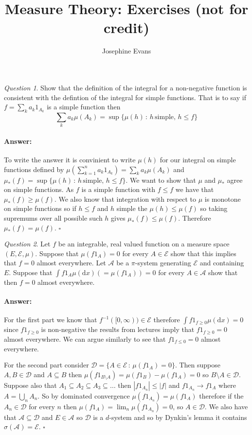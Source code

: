 \documentclass[11pt]{article}
\author{
Josephine Evans
}
\title{Measure Theory: Exercises (not for credit)}
\theoremstyle{definition}
\theoremstyle{remark}
\newtheorem{q}{Question}
\newenvironment{ans}{\paragraph{Answer:}}{\hfill$\square$ \vspace{10pt}}
\begin{document}
\maketitle

\begin{q}
Show that the definition of the integral for a non-negative function is consistent with the defintion of the integral for simple functions. That is to say if $f = \sum_k a_k 1_{A_k}$ is a simple function then 
\[ \sum_k a_k \mu(A_k) = \sup\{ \mu(h) \,:\, h \, \mbox{simple}, \, h \leq f\} \]
\end{q}
\begin{ans}
To write the answer it is convinient to write $\mu(h)$ for our integral on simple functions defined by $\mu(\sum_{k=1}^n a_k 1_{A_k}) = \sum_k a_k \mu(A_k)$ and $\mu_*(f) = \sup\{ \mu(h) \,:\, h \, \mbox{simple}, \, h \leq f\}$. We want to show that $\mu$ and $\mu_*$ agree on simple functions. As $f$ is a simple function with $f \leq f$ we have that $\mu_*(f) \geq \mu(f)$. We also know that integration with respect to $\mu$ is monotone on simple functions so if $h \leq f$ and $h$ simple the $\mu(h) \leq \mu(f)$ so taking supremums over all possible such $h$ gives $\mu_*(f) \leq \mu(f)$. Therefore $\mu_*(f) = \mu(f)$.
\end{ans}


\begin{q}
Let $f$ be an integrable, real valued function on a measure space $(E, \mathcal{E}, \mu)$. Suppose that $\mu(f1_A) = 0$ for every $A \in \mathcal{E}$ show that this implies that $f=0$ almost everywhere. Let $\mathcal{A}$ be a $\pi$-system generating $\mathcal{E}$ and containing $E$. Suppose that $\int f1_A \mu(\mathrm{d}x) \left(= \mu(f1_A)\right) = 0$ for every $A \in \mathcal{A}$ show that then $f = 0$ almost everywhere. 
\end{q}
\begin{ans} For the first part we know that $f^{-1}([0,\infty)) \in \mathcal{E}$ therefore $\int f1_{f \geq 0} \mu(\mathrm{d}x) = 0$ since $f1_{f \geq 0}$ is non-negative the results from lectures imply that $f1_{f \geq 0} = 0$ almost everywhere. We can argue similarly to see that $f 1_{f \leq 0} =0$ almost everywhere.

For the second part consider $\mathcal{D} = \{A \in \mathcal{E} \,:\, \mu(f1_A) = 0\}$. Then suppose $A, B \in \mathcal{D}$ and $A \subseteq B$ then $\mu(f1_{B \setminus A}) = \mu(f1_B) - \mu(f1_A) = 0$ so $B \setminus A \in \mathcal{D}$. Suppose also that $A_1 \subseteq A_2 \subseteq A_3 \subseteq \dots$ then $|f1_{A_n}| \leq |f|$ and $f1_{A_n} \rightarrow f1_A$ where $A = \bigcup_n A_n$. So by dominated convergence $\mu(f1_{A_n}) = \mu(f1_A)$ therefore if the $A_n \in \mathcal{D}$ for every $n$ then $\mu(f1_A) = \lim_n \mu(f1_{A_n}) = 0$, so $A \in \mathcal{D}$. We also have that $\mathcal{A} \subseteq \mathcal{D}$ and $E \in \mathcal{A}$ so $\mathcal{D}$ is a $d$-system and so by Dynkin's lemma it contains $\sigma(\mathcal{A}) = \mathcal{E}$.
\end{ans}
\end{document}
